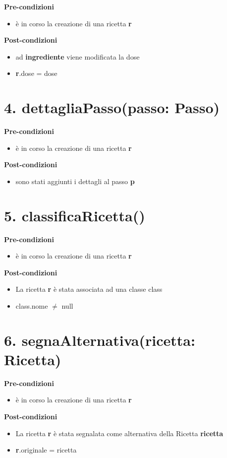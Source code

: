 \documentclass[12pt]{extarticle}
\begin{document}
\textbf{Pre-condizioni}
\begin{itemize}
  \item è in corso la creazione di una ricetta  \textbf{r}
\end{itemize}
\textbf{Post-condizioni}
\begin{itemize}
  \item ad  \textbf{ingrediente} viene modificata la dose
  \item \textbf{r}.dose = dose
\end{itemize}

\section*{4. dettagliaPasso(passo: Passo)}

\textbf{Pre-condizioni}
\begin{itemize}
  \item è in corso la creazione di una ricetta  \textbf{r}
\end{itemize}
\textbf{Post-condizioni}
\begin{itemize}
  \item sono stati aggiunti i dettagli al passo  \textbf{p}
\end{itemize}

\section*{5. classificaRicetta()}

\textbf{Pre-condizioni}
\begin{itemize}
  \item è in corso la creazione di una ricetta  \textbf{r}
\end{itemize}
\textbf{Post-condizioni}
\begin{itemize}
  \item La ricetta  \textbf{r} è stata associata ad una classe class
  \item class.nome $\neq$ null
\end{itemize}

\section*{6. segnaAlternativa(ricetta: Ricetta)}

\textbf{Pre-condizioni}
\begin{itemize}
  \item è in corso la creazione di una ricetta  \textbf{r}
\end{itemize}
\textbf{Post-condizioni}
\begin{itemize}
  \item La ricetta  \textbf{r} è stata segnalata come alternativa della Ricetta  \textbf{ricetta}
  \item \textbf{r}.originale = ricetta
\end{itemize}
\end{document}
